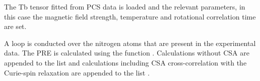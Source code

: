 \documentclass[a4paper,10pt,english,openany,oneside]{sphinxmanual}
\begin{document}
%
\begin{sphinxVerbatim}[commandchars=\\\{\}]
     

  

  

  
\end{sphinxVerbatim}

The Tb tensor fitted from PCS data is loaded and the relevant parameters, in this case the magnetic field strength, temperature and rotational correlation time are set.

%
\begin{sphinxVerbatim}[commandchars=\\\{\}]
  
  
  
  
\end{sphinxVerbatim}

A loop is conducted over the nitrogen atoms that are present in the experimental data. The PRE is calculated using the function . Calculations without CSA are appended to the list  and calculations including CSA cross-correlation with the Curie-spin relaxation are appended to the list .
\end{document}
